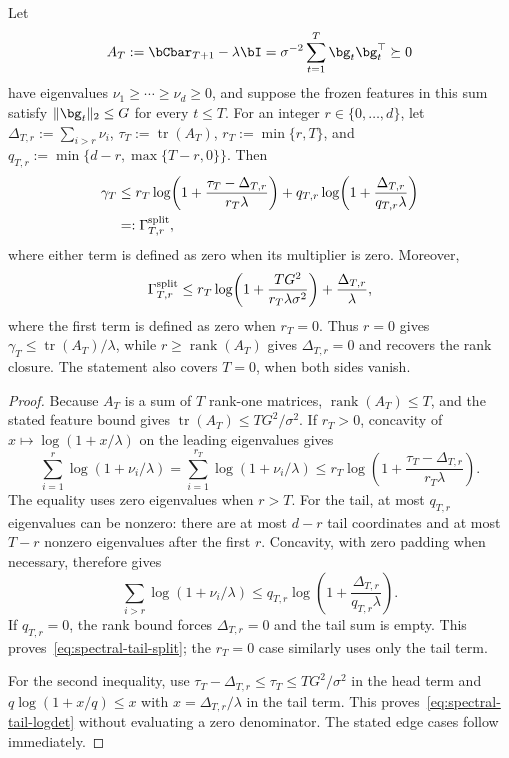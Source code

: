 \begin{lemma}\label{lem:spectral-tail-logdet}
Let
\[
 A_T:=\bCbar_{T+1}-\lambda\bI
 =\sigma^{-2}\sum_{t=1}^T\bg_t\bg_t^\top\succeq0
\]
have eigenvalues $\nu_1\ge\cdots\ge\nu_d\ge0$, and suppose the frozen
features in this sum satisfy $\|\bg_t\|_2\le G$ for every $t\le T$.
For an integer
$r\in\{0,\ldots,d\}$, let
$\Delta_{T,r}:=\sum_{i>r}\nu_i$, $\tau_T:=\operatorname{tr}(A_T)$,
$r_T:=\min\{r,T\}$, and
$q_{T,r}:=\min\{d-r,\max\{T-r,0\}\}$.  Then
\begin{equation}\label{eq:spectral-tail-split}
\begin{aligned}
 \gamma_T
 &\le r_T\log\!\left(1+\frac{\tau_T-\Delta_{T,r}}
 {r_T\lambda}\right)
 +q_{T,r}\log\!\left(1+\frac{\Delta_{T,r}}
 {q_{T,r}\lambda}\right)\\
 &=:\Gamma^{\rm split}_{T,r},
\end{aligned}
\end{equation}
where either term is defined as zero when its multiplier is zero.  Moreover,
\begin{equation}\label{eq:spectral-tail-logdet}
 \Gamma^{\rm split}_{T,r}\le
 r_T\log\!\left(1+\frac{TG^2}{r_T\lambda\sigma^2}\right)
 +\frac{\Delta_{T,r}}\lambda,
\end{equation}
where the first term is defined as zero when $r_T=0$.  Thus $r=0$ gives
$\gamma_T\le\operatorname{tr}(A_T)/\lambda$, while
$r\ge\operatorname{rank}(A_T)$ gives $\Delta_{T,r}=0$ and recovers the
rank closure.  The statement also covers $T=0$, when both sides vanish.
\end{lemma}
\begin{proof}
Because $A_T$ is a sum of $T$ rank-one matrices,
$\operatorname{rank}(A_T)\le T$, and the stated feature bound gives
$\operatorname{tr}(A_T)\le TG^2/\sigma^2$.  If $r_T>0$, concavity of
$x\mapsto\log(1+x/\lambda)$ on the leading eigenvalues gives
\[
 \sum_{i=1}^{r}\log(1+\nu_i/\lambda)
 =\sum_{i=1}^{r_T}\log(1+\nu_i/\lambda)
 \le r_T\log\!\left(1+
 \frac{\tau_T-\Delta_{T,r}}{r_T\lambda}\right).
\]
The equality uses zero eigenvalues when $r>T$.  For the tail,
at most $q_{T,r}$ eigenvalues can be nonzero: there are at most $d-r$ tail
coordinates and at most $T-r$ nonzero eigenvalues after the first $r$.
Concavity, with zero padding when necessary, therefore gives
\[
 \sum_{i>r}\log(1+\nu_i/\lambda)
 \le q_{T,r}\log\!\left(1+
 \frac{\Delta_{T,r}}{q_{T,r}\lambda}\right).
\]
If $q_{T,r}=0$, the rank bound forces $\Delta_{T,r}=0$ and the tail sum is
empty.  This proves~\eqref{eq:spectral-tail-split}; the $r_T=0$ case similarly
uses only the tail term.

For the second inequality, use
$\tau_T-\Delta_{T,r}\le\tau_T\le TG^2/\sigma^2$ in the head term and
$q\log(1+x/q)\le x$ with $x=\Delta_{T,r}/\lambda$ in the tail term.
This proves~\eqref{eq:spectral-tail-logdet} without evaluating a zero
denominator.  The stated edge cases follow immediately.
\end{proof}


